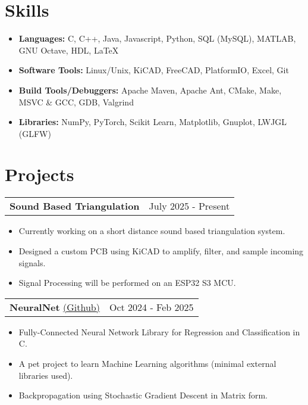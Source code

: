 \documentclass{article}
\begin{document}
\section{Skills} \vspace{4pt}
    \begin{itemize}
        \setlength{\itemsep}{-2pt}
        \item {\bf Languages:} C, C++, Java, Javascript, Python, SQL (MySQL), MATLAB, GNU Octave, HDL, \LaTeX
        \item {\bf Software Tools:} Linux/Unix, KiCAD, FreeCAD, PlatformIO, Excel, Git
        \item {\bf Build Tools/Debuggers:} Apache Maven, Apache Ant, CMake, Make, MSVC \& GCC, GDB, Valgrind
	\item {\bf Libraries:} NumPy, PyTorch, Scikit Learn, Matplotlib, Gnuplot, LWJGL (GLFW)
    \end{itemize}

\section{Projects}
    \raggedright\begin{tabular}{lr}
        \parbox[l]{3.65in}{\bf{\large{Sound Based Triangulation}}} &
        \parbox[r]{3.65in}{\raggedleft July 2025 - Present} \\
    \end{tabular}
    \begin{itemize} \vspace{-5pt}
        \setlength{\itemsep}{-2pt}
        \item Currently working on a short distance sound based triangulation system.
        \item Designed a custom PCB using KiCAD to amplify, filter, and sample incoming signals.
        \item Signal Processing will be performed on an ESP32 S3 MCU.
    \end{itemize}

    \raggedright\begin{tabular}{lr}
        \parbox[l]{3.65in}{{\bf{\large{NeuralNet}}} \href{https://github.com/avr34/NeuralNet}{(\underline{Github})}} &
        \parbox[r]{3.65in}{\raggedleft Oct 2024 - Feb 2025} \\
    \end{tabular}
    \begin{itemize} \vspace{-5pt}
        \setlength{\itemsep}{-2pt}
        \item Fully-Connected Neural Network Library for Regression and Classification in C.
        \item A pet project to learn Machine Learning algorithms (minimal external libraries used).
        \item Backpropagation using Stochastic Gradient Descent in Matrix form.
    \end{itemize}
\end{document}
